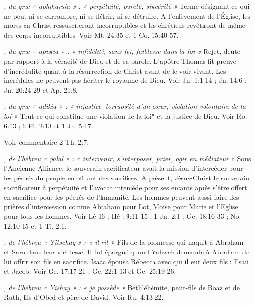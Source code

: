 \begin{multicols}{2}
{\textit{, du grec « aphtharsia » : « perpétuité, pureté, sincérité »}\newline
Terme désignant ce qui ne peut ni se corrompre, ni se flétrir, ni se détruire. A l'enlèvement de l'Église, les morts en Christ ressusciteront incorruptibles et les chrétiens revêtiront de même des corps incorruptibles. Voir Mt. 24:35 et 1 Co. 15:40-57.

\textit{, du grec « apistia » : « infidélité, sans foi, faiblesse dans la foi »}\newline
Rejet, doute par rapport à la véracité de Dieu et de sa parole. L'apôtre Thomas fit preuve d'incrédulité quant à la résurrection de Christ avant de le voir vivant. Les incrédules ne peuvent pas hériter le royaume de Dieu. Voir Jn. 1:1-14 ; Jn. 14:6 ; Jn. 20:24-29 et Ap. 21:8.

\textit{, du grec « adikia » : « injustice, tortuosité d'un cœur, violation volontaire de la loi »}\newline
Tout ce qui constitue une violation de la loi* et la justice de Dieu. Voir Ro. 6:13 ; 2 Pi. 2:13 et 1 Jn. 5:17.

\textit{}\newline
Voir commentaire 2 Th. 2:7.

\textit{, de l'hébreu « palal » : « intervenir, s'interposer, prier, agir en médiateur »}\newline
Sous l'Ancienne Alliance, le souverain sacrificateur avait la mission d'intercéder pour les péchés du peuple en offrant des sacrifices. A présent, Jésus-Christ le souverain sacrificateur à perpétuité et l'avocat intercède pour ses enfants après s'être offert en sacrifice pour les péchés de l'humanité. Les hommes peuvent aussi faire des prières d'intercession comme Abraham pour Lot, Moïse pour Marie et l'Eglise pour tous les hommes. Voir Lé 16 ; Hé : 9:11-15 ; 1 Jn. 2:1 ; Ge. 18:16-33 ; No. 12:10-15 et 1 Ti. 2:1.

\textit{, de l'hébreu « Yitschaq » : « il rit »}\newline
Fils de la promesse qui naquit à Abraham et Sara dans leur vieillesse. Il fut épargné quand Yahweh demanda à Abraham de lui offrir son fils en sacrifice. Isaac épousa Rébecca avec qui il eut deux fils : Esaü et Jacob. Voir Ge. 17:17-21 ; Ge. 22:1-13 et Ge. 25:19-26.

\textit{, de l'hébreu « Yishay » : « je possède »}\newline
Bethléhémite, petit-fils de Boaz et de Ruth, fils d'Obed et père de David. Voir Ru. 4:13-22.

}
\end{multicols}
